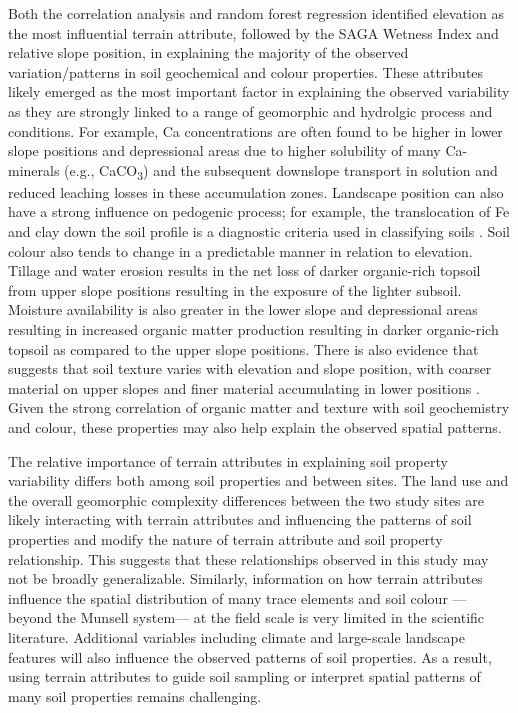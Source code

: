 \documentclass[
  number]{elsarticle}
\begin{document}
Both the correlation analysis and random forest regression identified
elevation as the most influential terrain attribute, followed by the
SAGA Wetness Index and relative slope position, in explaining the
majority of the observed variation/patterns in soil geochemical and
colour properties. These attributes likely emerged as the most important
factor in explaining the observed variability as they are strongly
linked to a range of geomorphic and hydrolgic process and conditions.
For example, Ca concentrations are often found to be higher in lower
slope positions and depressional areas due to higher solubility of many
Ca-minerals (e.g., CaCO\textsubscript{3}) and the subsequent downslope
transport in solution and reduced leaching losses in these accumulation
zones. Landscape position can also have a strong influence on pedogenic
process; for example, the translocation of Fe and clay down the soil
profile is a diagnostic criteria used in classifying soils
\citep{stonehouse1971}. Soil colour also tends to change in a
predictable manner in relation to elevation. Tillage and water erosion
results in the net loss of darker organic-rich topsoil from upper slope
positions resulting in the exposure of the lighter subsoil. Moisture
availability is also greater in the lower slope and depressional areas
resulting in increased organic matter production resulting in darker
organic-rich topsoil as compared to the upper slope positions. There is
also evidence that suggests that soil texture varies with elevation and
slope position, with coarser material on upper slopes and finer material
accumulating in lower positions \citep[\citep{cox2003}]{kokulan2018}.
Given the strong correlation of organic matter and texture with soil
geochemistry and colour, these properties may also help explain the
observed spatial patterns.

The relative importance of terrain attributes in explaining soil
property variability differs both among soil properties and between
sites. The land use and the overall geomorphic complexity differences
between the two study sites are likely interacting with terrain
attributes and influencing the patterns of soil properties and modify
the nature of terrain attribute and soil property relationship. This
suggests that these relationships observed in this study may not be
broadly generalizable. Similarly, information on how terrain attributes
influence the spatial distribution of many trace elements and soil
colour --- beyond the Munsell system--- at the field scale is very
limited in the scientific literature. Additional variables including
climate and large-scale landscape features will also influence the
observed patterns of soil properties. As a result, using terrain
attributes to guide soil sampling or interpret spatial patterns of many
soil properties remains challenging.
\end{document}
